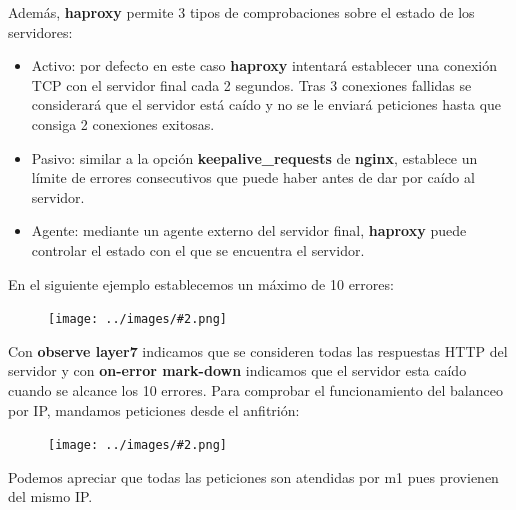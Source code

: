 \documentclass[twoside]{article}
\newcommand{\image}[2]{
\begin{figure}[H]
    \texttt{[image: ../images/\#2.png]}
    \centering
\end{figure}
}
\begin{document}
Además, \textbf{haproxy} permite 3 tipos de comprobaciones sobre el estado de los servidores:
\begin{itemize}
    \item Activo: por defecto en este caso \textbf{haproxy} intentará establecer una conexión TCP con el servidor final cada 2 segundos. Tras 3 conexiones fallidas se considerará que el servidor está caído y no se le enviará peticiones hasta que consiga 2 conexiones exitosas.
    \item Pasivo: similar a la opción \textbf{keepalive\_requests} de \textbf{nginx}, establece un límite de errores consecutivos que puede haber antes de dar por caído al servidor.
    \item Agente: mediante un agente externo del servidor final, \textbf{haproxy} puede controlar el estado con el que se encuentra el servidor.
\end{itemize}
En el siguiente ejemplo establecemos un máximo de 10 errores:
\image{8}{21}
Con \textbf{observe layer7} indicamos que se consideren todas las respuestas HTTP del servidor y con \textbf{on-error mark-down} indicamos que el servidor esta caído cuando se alcance los 10 errores.
Para comprobar el funcionamiento del balanceo por IP, mandamos peticiones desde el anfitrión:
\image{6}{22}
Podemos apreciar que todas las peticiones son atendidas por m1 pues provienen del mismo IP.
\end{document}
